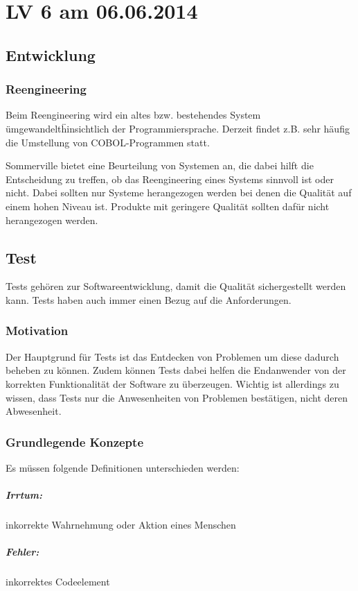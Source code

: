 \chapter{LV 6 am 06.06.2014}
\section{Entwicklung}
\subsection{Reengineering}
Beim Reengineering wird ein altes bzw. bestehendes System \"umgewandelt\" hinsichtlich der Programmiersprache. Derzeit findet z.B. sehr häufig die Umstellung von COBOL-Programmen statt.

Sommerville bietet eine Beurteilung von Systemen an, die dabei hilft die Entscheidung zu treffen, ob das Reengineering eines Systems sinnvoll ist oder nicht. Dabei sollten nur Systeme herangezogen werden bei denen die Qualität auf einem hohen Niveau ist. Produkte mit geringere Qualität sollten dafür nicht herangezogen werden.

\section{Test}
Tests gehören zur Softwareentwicklung, damit die Qualität sichergestellt werden kann. Tests haben auch immer einen Bezug auf die Anforderungen. 
\subsection{Motivation}
Der Hauptgrund für Tests ist das Entdecken von Problemen um diese dadurch beheben zu können. Zudem  können Tests dabei helfen die Endanwender von der korrekten Funktionalität der Software zu überzeugen. Wichtig ist allerdings zu wissen, dass Tests nur die Anwesenheiten von Problemen bestätigen, nicht deren Abwesenheit.

\subsection{Grundlegende Konzepte}
Es müssen folgende Definitionen unterschieden werden:
\paragraph{Irrtum:} inkorrekte Wahrnehmung oder Aktion eines Menschen
\paragraph{Fehler:} inkorrektes Codeelement
